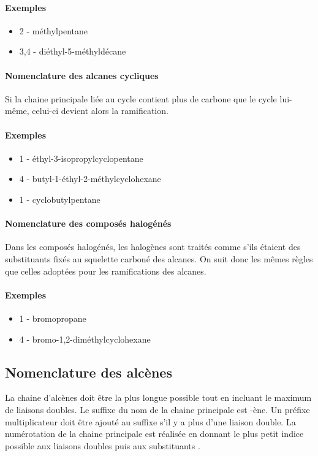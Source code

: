 \paragraph{Exemples}
\begin{itemize}
  \item 2 - méthylpentane
  \item 3,4 - diéthyl-5-méthyldécane
\end{itemize}

\paragraph{Nomenclature des alcanes cycliques}
Si la chaine principale liée au cycle contient plus de carbone que le cycle lui-même, celui-ci devient alors la ramification.

\paragraph{Exemples}
\begin{itemize}
  \item 1 - éthyl-3-isopropylcyclopentane
  \item 4 - butyl-1-éthyl-2-méthylcyclohexane
  \item 1 - cyclobutylpentane
\end{itemize}

\paragraph{Nomenclature des composés halogénés}
Dans les composés halogénés, les halogènes sont traités comme s'ils étaient des substituants fixés au squelette carboné des alcanes.
On suit donc les mêmes règles que celles adoptées pour les ramifications des alcanes.

\paragraph{Exemples }
\begin{itemize}
  \item 1 - bromopropane
  \item 4 - bromo-1,2-diméthylcyclohexane
\end{itemize}

\subsection{Nomenclature des alcènes}
La chaine d'alcènes doit être la plus longue possible tout en incluant le maximum de liaisons doubles.
Le suffixe du nom de la chaine principale est -ène.
Un préfixe multiplicateur doit être ajouté au suffixe s'il y a plus d'une liaison double.
La numérotation de la chaine principale est réalisée en donnant le plus petit indice possible aux liaisons doubles puis aux substituants .

